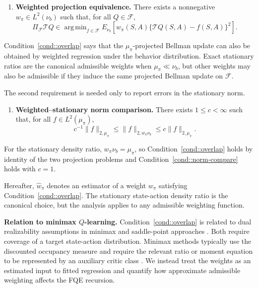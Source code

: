 \documentclass{article}
\DeclareMathOperator*{\argmin}{arg\,min}
\theoremstyle{plain}
\theoremstyle{definition}
\theoremstyle{remark}
\begin{document}
\begin{enumerate}[label=\textbf{C\arabic*}, ref={C\arabic*}, leftmargin=1.5em,resume=cond]
\item \label{cond::overlap}
\textbf{Weighted projection equivalence.}
There exists a nonnegative \(w_{\pi}\in L^2(\nu_b)\) such that, for all
\(Q\in\mathcal F\),
\[
\Pi_{\mathcal F}\mathcal TQ
\in
\argmin_{f\in\mathcal F}
E_{\nu_b}\!\left[
w_{\pi}(S,A)\{\mathcal TQ(S,A)-f(S,A)\}^2
\right].
\]
\end{enumerate}

Condition~\ref{cond::overlap} says that the \(\mu_\pi\)-projected Bellman
update can also be obtained by weighted regression under the behavior
distribution. Exact stationary ratios are the canonical admissible weights when
\(\mu_\pi\ll\nu_b\), but other weights may also be admissible if they induce
the same projected Bellman update on \(\mathcal F\).

The second requirement is needed only to report errors in the stationary norm.

\begin{enumerate}[label=\textbf{C\arabic*}, ref={C\arabic*}, leftmargin=1.5em,resume=cond]
\item \label{cond::norm-compare}
\textbf{Weighted--stationary norm comparison.}
There exists \(1\le c<\infty\) such that, for all \(f\in L^2(\mu_\pi)\),
\[
c^{-1}\|f\|_{2,\mu_\pi}
\le
\|f\|_{2,w_\pi\nu_b}
\le
c\|f\|_{2,\mu_\pi}.
\]
\end{enumerate}

For the stationary density ratio, \(w_\pi\nu_b=\mu_\pi\), so
Condition~\ref{cond::overlap} holds by identity of the two projection problems
and Condition~\ref{cond::norm-compare} holds with \(c=1\).

Hereafter, \(\widehat w_\pi\) denotes an estimator of a weight \(w_\pi\)
satisfying Condition~\ref{cond::overlap}. The stationary state-action density
ratio is the canonical choice, but the analysis applies to any admissible
weighting function.

\textbf{Relation to minimax \(Q\)-learning.}
Condition~\ref{cond::overlap} is related to dual realizability assumptions in
minimax and saddle-point approaches
\citep{uehara2020minimax,xie2021bellman,imaizumi2021minimax,
uehara2023offline,zanette2022bellman}. Both require coverage of a target
state-action distribution. Minimax methods typically use the discounted
occupancy measure and require the relevant ratio or moment equation to be
represented by an auxiliary critic class
\citep[see, e.g., Section~6 of][]{xie2021bellman}. We instead treat the weights
as an estimated input to fitted regression and quantify how approximate
admissible weighting affects the FQE recursion.
\end{document}
